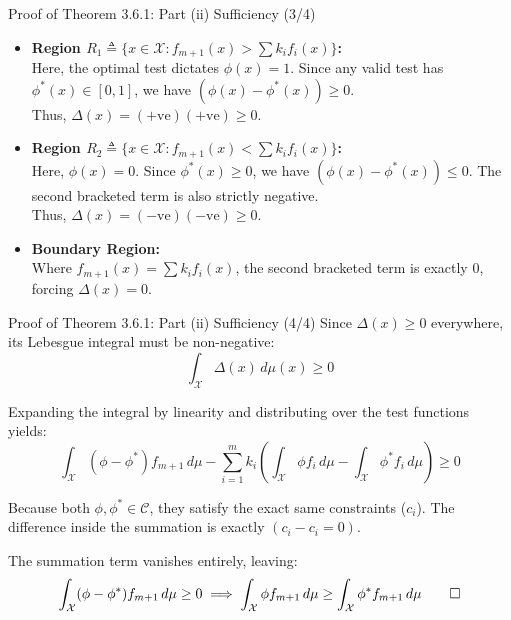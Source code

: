 \documentclass[10pt, aspectratio=169, xcolor=dvipsnames]{beamer}
\newcommand{\lead}[1]{{\color{UniBlue}\bfseries #1}}
\begin{document}
\begin{frame}{Proof of Theorem 3.6.1: Part (ii) Sufficiency (3/4)}
    \begin{itemize}
        \item \lead{Region $R_1 \triangleq \{x \in \mathcal{X} : f_{m+1}(x) > \sum k_i f_i(x)\}$:}\\
        \vspace{0.1cm}
        Here, the optimal test dictates $\phi(x) = 1$. Since any valid test has $\phi^*(x) \in [0,1]$, we have $(\phi(x) - \phi^*(x)) \ge 0$. \\
        Thus, $\Delta(x) = (+\text{ve})(+\text{ve}) \ge 0$.
        
        \vspace{0.4cm}
        \item \lead{Region $R_2 \triangleq \{x \in \mathcal{X} : f_{m+1}(x) < \sum k_i f_i(x)\}$:}\\
        \vspace{0.1cm}
        Here, $\phi(x) = 0$. Since $\phi^*(x) \ge 0$, we have $(\phi(x) - \phi^*(x)) \le 0$. The second bracketed term is also strictly negative. \\
        Thus, $\Delta(x) = (-\text{ve})(-\text{ve}) \ge 0$.
        
        \vspace{0.4cm}
        \item \lead{Boundary Region:}\\
        \vspace{0.1cm}
        Where $f_{m+1}(x) = \sum k_i f_i(x)$, the second bracketed term is exactly $0$, forcing $\Delta(x) = 0$.
    \end{itemize}
\end{frame}

\begin{frame}{Proof of Theorem 3.6.1: Part (ii) Sufficiency (4/4)}
    Since $\Delta(x) \ge 0$ everywhere, its Lebesgue integral must be non-negative:
    \[ \int_{\mathcal{X}} \Delta(x) \, d\mu(x) \ge 0 \]
    
    \vspace{0.2cm}
    Expanding the integral by linearity and distributing over the test functions yields:
    \[ \int_{\mathcal{X}} (\phi - \phi^*) f_{m+1} \, d\mu - \sum_{i=1}^m k_i \left( \int_{\mathcal{X}} \phi f_i \, d\mu - \int_{\mathcal{X}} \phi^* f_i \, d\mu \right) \ge 0 \]
    
    \vspace{0.3cm}
    Because both $\phi, \phi^* \in \mathcal{C}$, they satisfy the exact same constraints ($c_i$). The difference inside the summation is exactly $(c_i - c_i = 0)$. 
    
    \vspace{0.3cm}
    The summation term vanishes entirely, leaving:
    \[ \int_{\mathcal{X}} (\phi - \phi^*) f_{m+1} \, d\mu \ge 0 \implies \int_{\mathcal{X}} \phi f_{m+1} \, d\mu \ge \int_{\mathcal{X}} \phi^* f_{m+1} \, d\mu \qed \]
\end{frame}
\end{document}
